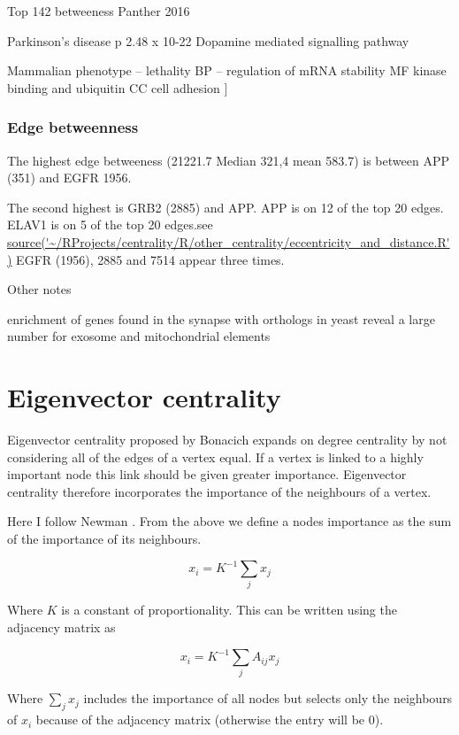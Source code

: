 Top 142 betweeness
Panther 2016

Parkinson’s disease p 2.48 x 10-22
Dopamine mediated signalling pathway

Mammalian phenotype – lethality
BP – regulation of mRNA stability 
MF kinase binding and ubiquitin
CC cell adhesion
	]
\subsubsection{Edge betweenness}

The highest edge betweeness (21221.7 Median 321,4 mean 583.7) is between APP (351) and EGFR 1956.

The second highest is GRB2 (2885) and APP.
APP is on 12 of the top 20 edges. 
ELAV1 is on 5 of the top 20 edges.see \url{source('~/RProjects/centrality/R/other_centrality/eccentricity_and_distance.R')} EGFR (1956), 2885 and 7514 appear three times.



Other notes 

enrichment of genes found in the synapse with orthologs in yeast reveal a large number for exosome and mitochondrial elements


\section{Eigenvector centrality}

Eigenvector centrality proposed by Bonacich \cite{bonacich1972factoring} expands on degree centrality by not considering all of the edges of a vertex equal. If a vertex is linked to a highly important node this link should be given greater importance. Eigenvector centrality therefore incorporates the importance of the neighbours of a vertex.

Here I follow Newman \cite{newman2018networks}. From the above we define a nodes importance as the sum of the importance of its neighbours.

\begin{equation}
    x_i = K^{-1} \sum_j x_j
\end{equation}

Where $K$ is a constant of proportionality. This can be written using the adjacency matrix as

\begin{equation}
    x_i = K^{-1} \sum_j A_{ij} x_j
\end{equation}

Where $\sum_j x_j$ includes the importance of all nodes but selects only the neighbours of $x_i$ because of the adjacency matrix (otherwise the entry will be 0).


